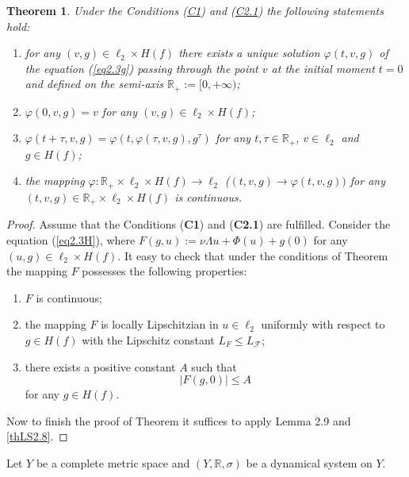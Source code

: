 \documentclass{amsart}%
\newtheorem{theorem}[lemma]{Theorem}
\begin{document}
{\color{violet}
\begin{theorem}\cite[Ch.VI]{Che_2020} \cite[Ch.II]{hartman}
\label{th1.2} Under the Conditions (\hyperref[C1]{C1}) and
(\hyperref[C2.1]{C2.1}) the following statements hold:
\begin{enumerate}
    \item for any $(v,g)\in \ell_{2}\times H(f)$ there exists a unique
    solution $\varphi(t,v,g)$ of the equation (\ref{eq2.3g}) passing
    through the point $v$ at the initial moment $t=0$ and defined on
    the semi-axis $\mathbb R_{+}:=[0,+\infty)$; \item
    $\varphi(0,v,g)=v$ for any $(v,g)\in \ell_{2}\times H(f)$; \item
    $\varphi(t+\tau,v,g)=\varphi(t,\varphi(\tau,v,g),g^{\tau})$ for
    any $t,\tau\in \mathbb R_{+}$, $v\in \ell_{2}$ and $g\in H(f)$;
     \item the mapping
    $\varphi :\mathbb R_{+}\times \ell_{2}\times H(f)\to \ell_{2}$
    ($(t,v,g)\to \varphi(t,v,g))$ for any $(t,v,g)\in \mathbb
    R_{+}\times \ell_{2}\times H(f)$ is continuous.
\end{enumerate}
\end{theorem}
\begin{proof}
Assume that the Conditions (\textbf{C1}) and (\textbf{C2.1}) are
fulfilled. Consider the equation (\ref{eq2.3H}), where
$F(g,u):=\nu \Lambda u +\Phi(u)+g(0)$ for any $(u,g)\in
\ell_{2}\times H(f)$. It easy to check that under the conditions
of Theorem the mapping $F$ possesses the following properties:
\begin{enumerate}
\item $F$ is continuous; 
\item the mapping $F$ is locally Lipschitzian in
$u\in \ell_{2}$ uniformly with respect to $g\in H(f)$ with the
Lipschitz constant $L_{F}\le L_{\mathcal F}$; 
\item there exists a
positive constant $A$ such that
\begin{equation}\label{eqA2}
|F(g,0)|\le A
\end{equation}
for any $g\in H(f)$.
\end{enumerate}

Now to finish the proof of Theorem it suffices to apply Lemma 2.9 and \cite[Ch.II]{hartman}
\ref{thLS2.8}.
\end{proof}
}

Let $Y$ be a complete metric space and $(Y,\mathbb R,\sigma)$ be a
dynamical system on $Y$.
\end{document}
